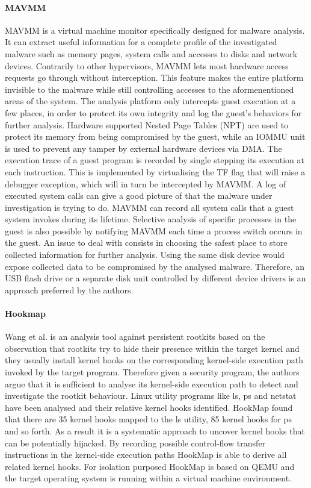 \paragraph{MAVMM}
MAVMM \cite{MAVMM} is a virtual machine monitor specifically designed for malware analysis. It can extract useful information for a complete profile of the investigated malware such as memory pages, system calls and accesses to disks and network devices. Contrarily to other hypervisors, MAVMM lets most hardware access requests go through without interception. This feature makes the entire platform invisible to the malware while still controlling accesses to the aformenentioned areas of the system. The analysis platform only intercepts guest execution at a few places, in order to protect its own integrity and log the guest’s behaviors for further analysis. Hardware supported Nested Page Tables (NPT) are used to protect its memory from being compromised by the guest, while an IOMMU unit is used to prevent any tamper by external hardware devices via DMA.
The execution trace of a guest program is recorded by single stepping its execution at each instruction. This is implemented by virtualising the TF flag that will raise a debugger exception, which will in turn be intercepted by MAVMM. 
A log of executed system calls can give a good picture of that the malware under investigation is trying to do. MAVMM can record all system calls that a guest system invokes during its lifetime. Selective analysis of specific processes in the guest is also possible by notifying MAVMM each time a process switch occurs in the guest.
An issue to deal with consists in choosing the safest place to store collected information for further analysis. Using the same disk device would expose collected data to be compromised by the analysed malware. Therefore, an USB flash drive or a separate disk unit controlled by different device drivers is an approach preferred by the authors.



\paragraph{Hookmap}
Wang et al. \cite{hookmap} is an analysis tool against persistent rootkits based on the observation that rootkits try to hide their presence within the target kernel and they usually install kernel hooks on the corresponding kernel-side execution path invoked by the target program. Therefore given a security program, the authors argue that it is sufficient to analyse its kernel-side execution path to detect and investigate the rootkit behaviour. Linux utility programs like ls, ps and netstat have been analysed and their relative kernel hooks identified. HookMap found that there are 35 kernel hooks mapped to the ls utility, 85 kernel hooks for ps and so forth. As a result it is a systematic approach to uncover kernel hooks that can be potentially hijacked. By recording possible control-flow transfer instructions in the kernel-side execution paths HookMap is able to derive all related kernel hooks. For isolation purposed HookMap is based on QEMU and the target operating system is running within a virtual machine environment. 


